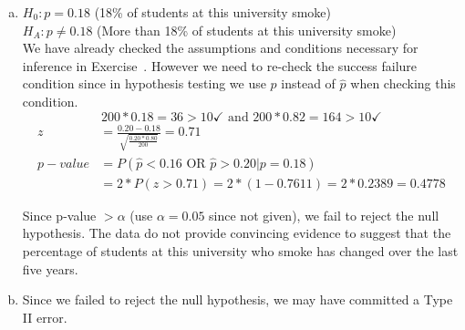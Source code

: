 {
\begin{enumerate}[(a)]

\item $H_0: p = 0.18$ (18\% of students at this university smoke) \\
$H_A: p \ne 0.18$ (More than 18\% of students at this university smoke) \\

We have already checked the assumptions and conditions necessary for inference in Exercise~. However we need to re-check the success failure condition since in hypothesis testing we use $p$ instead of $\hat{p}$ when checking this condition.
\[ 200 * 0.18 = 36 > 10 \checkmark \text{ and } 200 * 0.82 = 164 > 10 \checkmark \]
\begin{align*}
z &= \frac{0.20 - 0.18}{\sqrt{\frac{0.20 * 0.80}{200}}} = 0.71 \\
p-value &= P(\hat{p} < 0.16 \text{ OR } \hat{p} > 0.20 | p = 0.18) \\
&= 2 * P(z > 0.71) = 2 * (1 - 0.7611) = 2 * 0.2389 = 0.4778
\end{align*}

Since p-value $> \alpha$ (use $\alpha = 0.05$ since not given), we fail to reject the null hypothesis. The data do not provide convincing evidence to suggest that the percentage of students at this university who smoke has changed over the last five years.

\item Since we failed to reject the null hypothesis, we may have committed a Type II error.

\end{enumerate}
}

%

